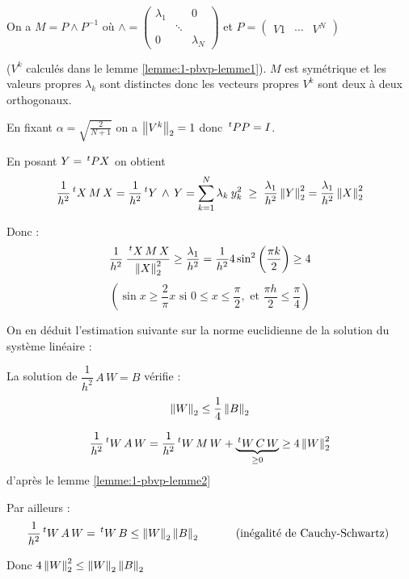 \begin{preuve}
    On a $M = P \wedge P^{-1}$ où
    $\wedge =
    \begin{pmatrix}
        \lambda_1 & & 0 \\
        & \ddots & \\
        0 & & \lambda_N
    \end{pmatrix}
    $
    et
    $ P =
    \begin{pmatrix}
        V1 & \cdots & V^N
    \end{pmatrix}
    $

    ($V^k$ calculés dans le lemme \ref{lemme:1-pbvp-lemme1}). $M$ est symétrique
    et les valeurs propres $\lambda_k$ sont distinctes donc les vecteurs propres
    $V^k$ sont deux à deux orthogonaux.

    En fixant $\alpha = \sqrt{\frac{2}{N+1}}$ on a $\left\lVert V^k\right\rVert_2 = 1$ donc
    $\,^tP P = I$.

    En posant $Y = \,^tP X$ on obtient 
    \[
        \frac{1}{h^2} \,^tX \, M \, X =
        \frac{1}{h^2} \,^tY \, \wedge \, Y = \sum_{k=1}^N \lambda_k \: y_k^2
        \; \geq \; \frac{\lambda_1}{h^2} \left\lVert Y\right\rVert_2^2 = \frac{\lambda_1}{h^2} \left\lVert X\right\rVert_2^2
    \]

    Donc : 
    \[
        \frac{1}{h^2} \: \frac{\,^tX \, M \, X}{\left\lVert X\right\rVert_2^2} \geq \frac{\lambda_1}{h^2} = \frac{1}{h^2} 4 \sin^2 \left( \frac{\pi k }{2} \right) \geq 4
    \]
    \[
        ( \sin x \geq \frac{2}{\pi} x \text{ si } 0 \leq x \leq \dfrac{\pi}{2},
        \text{ et } \frac{\pi h}{2} \leq \frac{\pi}{4} )
    \]
\end{preuve}

    On en déduit l'estimation suivante sur la norme euclidienne de la solution
    du système linéaire :
\begin{lemme}
    La solution de $\dfrac{1}{h^2} \, A \, W = B$ vérifie :
    \[
        \left\lVert W\right\rVert_2 \leq \frac{1}{4} \left\lVert B\right\rVert_2
    \]
    \label{lemme:1-pbvp-lemme3}
\end{lemme}

\begin{preuve}
    \[
        \frac{1}{h^2} \,^tW \, A \, W = \frac{1}{h^2} \,^tW \, M \, W +
        \underbrace{\,^tW \, C \, W}_{\geq 0} \geq 4 \left\lVert W\right\rVert_2^2
    \] d'après le lemme \ref{lemme:1-pbvp-lemme2}

    Par ailleurs :
    \[
        \frac{1}{h^2} \,^tW \, A \, W = \,^tW \, B \leq \left\lVert W\right\rVert_2 \left\lVert B\right\rVert_2
        \hspace{1cm} \text{ (inégalité de Cauchy-Schwartz) }
    \]

    Donc $4 \left\lVert W\right\rVert_2^2 \leq \left\lVert W\right\rVert_2 \left\lVert B\right\rVert_2$
\end{preuve}

